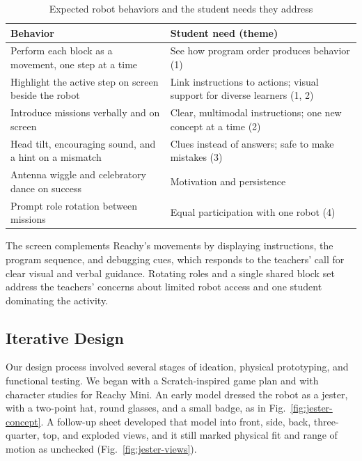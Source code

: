 \documentclass[conference]{IEEEtran}
\begin{document}
\begin{table}[t]
\centering
\caption{Expected robot behaviors and the student needs they address}
\label{tab:behaviors}
\begin{tabularx}{\columnwidth}{>{\raggedright\arraybackslash}p{} Y}
\hline
\textbf{Behavior} & \textbf{Student need (theme)} \\
\hline
Perform each block as a movement, one step at a time & See how program order produces behavior (1) \\
Highlight the active step on screen beside the robot & Link instructions to actions; visual support for diverse learners (1, 2) \\
Introduce missions verbally and on screen & Clear, multimodal instructions; one new concept at a time (2) \\
Head tilt, encouraging sound, and a hint on a mismatch & Clues instead of answers; safe to make mistakes (3) \\
Antenna wiggle and celebratory dance on success & Motivation and persistence \\
Prompt role rotation between missions & Equal participation with one robot (4) \\
\hline
\end{tabularx}
\end{table}

The screen complements Reachy's movements by displaying instructions, the program sequence, and debugging cues, which responds to the teachers' call for clear visual and verbal guidance. Rotating roles and a single shared block set address the teachers' concerns about limited robot access and one student dominating the activity.

\subsection{Iterative Design}

Our design process involved several stages of ideation, physical prototyping, and functional testing. We began with a Scratch-inspired game plan and with character studies for Reachy Mini. An early model dressed the robot as a jester, with a two-point hat, round glasses, and a small badge, as in Fig.~\ref{fig:jester-concept}. A follow-up sheet developed that model into front, side, back, three-quarter, top, and exploded views, and it still marked physical fit and range of motion as unchecked (Fig.~\ref{fig:jester-views}).
\end{document}
